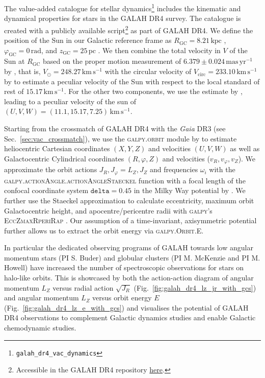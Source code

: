 \documentclass[
  journal=pasa,
  manuscript=research-paper, %
  year=2024,
  volume=37
]{cup-journal}
\newcommand{\Gaia}{\textit{Gaia}\xspace}
\begin{document}
The value-added catalogue for stellar dynamics\footnote{\texttt{galah\_dr4\_vac\_dynamics}} includes the kinematic and dynamical properties for stars in the GALAH DR4 survey. The catalogue is created with a publicly available script\footnote{Accessible in the GALAH DR4 repository \href{https://github.com/svenbuder/GALAH_DR4/blob/main/catalogs/create_galah_dr4_vac_dynamics.ipynb}{here}.} as part of GALAH DR4. 
We define the position of the Sun in our Galactic reference frame as $R_\mathrm{GC} = 8.21\,\mathrm{kpc}$ \citep{McMillan2017}, $\varphi_\mathrm{GC} = 0\,\mathrm{rad}$, and $z_\mathrm{GC} = 25\,\mathrm{pc}$ \citep{BlandHawthorn_Gerhard2016}. We then combine the total velocity  in $V$ of the Sun at $R_\mathrm{GC}$ based on the proper motion measurement of $6.379\pm0.024\,\mathrm{mas\,yr^{-1}}$ by \citep{Reid2004}, that is, $V_\odot = 248.27\,\mathrm{km\,s^{-1}}$ with the circular velocity of $V_\mathrm{circ} = 233.10\,\mathrm{km\,s^{-1}}$ by \citet{McMillan2017} to estimate a peculiar velocity of the Sun with respect to the local standard of rest of  $15.17\,\mathrm{km\,s^{-1}}$. For the other two components, we use the estimate by \citet{Schoenrich2010}, leading to a peculiar velocity of the sun of $(U,V,W) = (11.1, 15.17, 7.25)\,\mathrm{km\,s^{-1}}$.

Starting from the crossmatch of GALAH DR4 with the \Gaia DR3 (see Sec.~\ref{sec:vac_crossmatch}), we use the \textsc{galpy.orbit} module by \citet{Bovy2015} to estimate heliocentric Cartesian coordinates $(X,Y,Z)$ and velocities $(U,V,W)$ as well as Galactocentric Cylindrical coordinates $(R, \varphi, Z)$ and velocities ($v_R, v_\varphi, v_Z$). We approximate the orbit actions $J_R, J_\varphi = L_Z, J_Z$ and frequencies $\omega_i$ with the \textsc{galpy.actionAngle.actionAngleStaeckel} function with a focal length of the confocal coordinate system $\texttt{delta} = 0.45$ in the Milky Way potential by \citet{McMillan2017}. We further use the Staeckel approximation \citep{Binney2012} to calculate eccentricity, maximum orbit Galactocentric height, and apocentre/pericentre radii with \textsc{galpy}'s \textsc{EccZmaxRperiRap} \citep{Mackereth2018}. Our assumption of a time-invariant, axisymmetric potential further allows us to extract the orbit energy via \textsc{galpy.Orbit.E}.

In particular the dedicated observing programs of GALAH towards low angular momentum stars (PI S. Buder) and globular clusters (PI M. McKenzie and PI M. Howell) have increased the number of spectroscopic observations for stars on halo-like orbits. This is showcased by both the action-action diagram of angular momentum $L_Z$ versus radial action $\sqrt{J_R}$ (Fig.~\ref{fig:galah_dr4_lz_jr_with_gcs}) and angular momentum $L_Z$ versus orbit energy $E$ (Fig.~\ref{fig:galah_dr4_lz_e_with_gcs}) and visualises the potential of GALAH DR4 observations to complement Galactic dynamics studies and enable Galactic chemodynamic studies.
\end{document}
